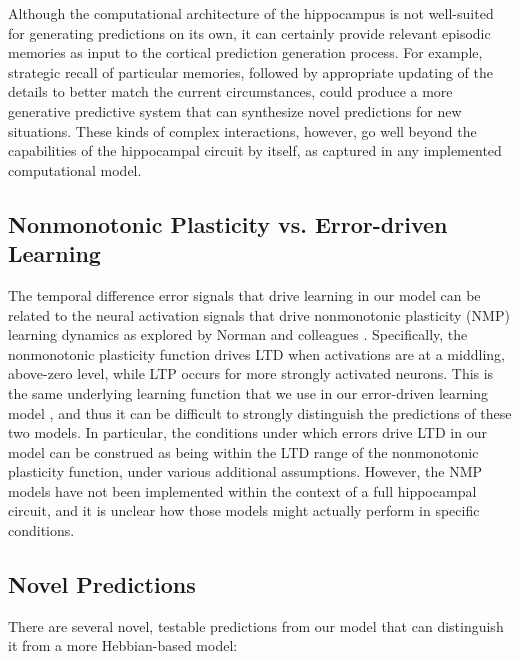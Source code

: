 \documentclass[11pt,twoside]{article}
\newif\myifpdf
\begin{document}
Although the computational architecture of the hippocampus is not well-suited for generating predictions on its own, it can certainly provide relevant episodic memories as input to the cortical prediction generation process.  For example, strategic recall of particular memories, followed by appropriate updating of the details to better match the current circumstances, could produce a more generative predictive system that can synthesize novel predictions for new situations. These kinds of complex interactions, however, go well beyond the capabilities of the hippocampal circuit by itself, as captured in any implemented computational model.

\subsection{Nonmonotonic Plasticity vs. Error-driven Learning}

The temporal difference error signals that drive learning in our model can be related to the neural activation signals that drive nonmonotonic plasticity (NMP) learning dynamics as explored by Norman and colleagues \citep{RitvoTurk-BrowneNorman19}.  Specifically, the nonmonotonic plasticity function drives LTD when activations are at a middling, above-zero level, while LTP occurs for more strongly activated neurons.  This is the same underlying learning function that we use in our error-driven learning model \citep{OReillyMunakataFrankEtAl12}, and thus it can be difficult to strongly distinguish the predictions of these two models.  In particular, the conditions under which errors drive LTD in our model can be construed as being within the LTD range of the nonmonotonic plasticity function, under various additional assumptions.  However, the NMP models have not been implemented within the context of a full hippocampal circuit, and it is unclear how those models might actually perform in specific conditions.

\subsection{Novel Predictions}

There are several novel, testable predictions from our model that can distinguish it from a more Hebbian-based model:
\end{document}
